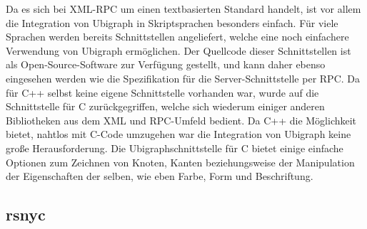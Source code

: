 Da es sich bei XML-RPC um einen textbasierten Standard handelt, ist vor allem die Integration von Ubigraph in Skriptsprachen besonders einfach. Für viele Sprachen werden bereits Schnittstellen angeliefert,
welche eine noch einfachere Verwendung von Ubigraph ermöglichen. Der Quellcode dieser Schnittstellen ist als Open-Source-Software zur Verfügung gestellt, und kann daher ebenso eingesehen werden wie die
Spezifikation für die Server-Schnittstelle per RPC. Da für C++ selbst keine eigene Schnittstelle vorhanden war, wurde auf die Schnittstelle für C zurückgegriffen, welche sich wiederum einiger anderen Bibliotheken
aus dem XML und RPC-Umfeld bedient. Da C++ die Möglichkeit bietet, nahtlos mit C-Code umzugehen war die Integration von Ubigraph keine große Herausforderung. Die Ubigraphschnittstelle für C bietet einige
einfache Optionen zum Zeichnen von Knoten, Kanten beziehungsweise der Manipulation der Eigenschaften der selben, wie eben Farbe, Form und Beschriftung.


\subsection{rsnyc}
